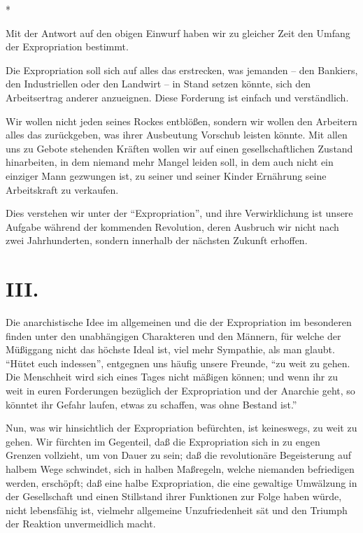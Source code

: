 \documentclass{scrbook}
\begin{document}
\begin{center}*\end{center}

Mit der Antwort auf den obigen Einwurf haben wir zu gleicher Zeit den Umfang der Expropriation bestimmt.

Die Expropriation soll sich auf alles das erstrecken, was jemanden – den Bankiers, den Industriellen oder den Landwirt – in Stand setzen könnte, sich den Arbeitsertrag anderer anzueignen. Diese Forderung ist einfach und verständlich.

Wir wollen nicht jeden seines Rockes entblößen, sondern wir wollen den Arbeitern alles das zurückgeben, was ihrer Ausbeutung Vorschub leisten könnte. Mit allen uns zu Gebote stehenden Kräften wollen wir auf einen gesellschaftlichen Zustand hinarbeiten, in dem niemand mehr Mangel leiden soll, in dem auch nicht ein einziger Mann gezwungen ist, zu seiner und seiner Kinder Ernährung seine Arbeitskraft zu verkaufen.

Dies verstehen wir unter der ``Expropriation'', und ihre Verwirklichung ist unsere Aufgabe während der kommenden Revolution, deren Ausbruch wir nicht nach zwei Jahrhunderten, sondern innerhalb der nächsten Zukunft erhoffen.

\section*{III.}

Die anarchistische Idee im allgemeinen und die der Expropriation im besonderen finden unter den unabhängigen Charakteren und den Männern, für welche der Müßiggang nicht das höchste Ideal ist, viel mehr Sympathie, als man glaubt. ``Hütet euch indessen'', entgegnen uns häufig unsere Freunde, ``zu weit zu gehen. Die Menschheit wird sich eines Tages nicht mäßigen können; und wenn ihr zu weit in euren Forderungen bezüglich der Expropriation und der Anarchie geht, so könntet ihr Gefahr laufen, etwas zu schaffen, was ohne Bestand ist.''

Nun, was wir hinsichtlich der Expropriation befürchten, ist keineswegs, zu weit zu gehen. Wir fürchten im Gegenteil, daß die Expropriation sich in zu engen Grenzen vollzieht, um von Dauer zu sein; daß die revolutionäre Begeisterung auf halbem Wege schwindet, sich in halben Maßregeln, welche niemanden befriedigen werden, erschöpft; daß eine halbe Expropriation, die eine gewaltige Umwälzung in der Gesellschaft und einen Stillstand ihrer Funktionen zur Folge haben würde, nicht lebensfähig ist, vielmehr allgemeine Unzufriedenheit sät und den Triumph der Reaktion unvermeidlich macht.
\end{document}
